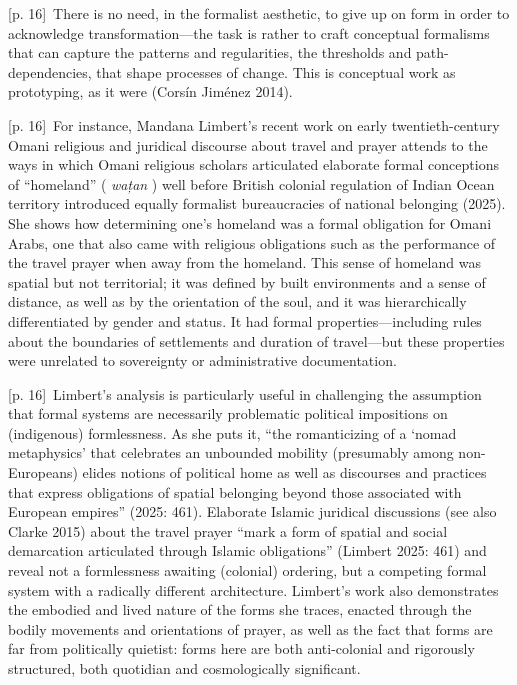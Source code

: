 \documentclass[10pt,a4paper]{article}
\begin{document}
{\scriptsize\color{gray} [p. 16]}\ There is no need, in the formalist aesthetic, to give up on form in order to acknowledge transformation—the task is rather to craft conceptual formalisms that can capture the patterns and regularities, the thresholds and path-dependencies, that shape processes of change. This is conceptual work as prototyping, as it were (Corsín Jiménez 2014).\par
{\scriptsize\color{gray} [p. 16]}\ For instance, Mandana Limbert’s recent work on early twentieth-century Omani religious and juridical discourse about travel and prayer attends to the ways in which Omani religious scholars articulated elaborate formal conceptions of “homeland” ( \textit{wațan} ) well before British colonial regulation of Indian Ocean territory introduced equally formalist bureaucracies of national belonging (2025). She shows how determining one’s homeland was a formal obligation for Omani Arabs, one that also came with religious obligations such as the performance of the travel prayer when away from the homeland. This sense of homeland was spatial but not territorial; it was defined by built environments and a sense of distance, as well as by the orientation of the soul, and it was hierarchically differentiated by gender and status. It had formal properties—including rules about the boundaries of settlements and duration of travel—but these properties were unrelated to sovereignty or administrative documentation.\par
{\scriptsize\color{gray} [p. 16]}\ Limbert’s analysis is particularly useful in challenging the assumption that formal systems are necessarily problematic political impositions on (indigenous) formlessness. As she puts it, “the romanticizing of a ‘nomad metaphysics’ that celebrates an unbounded mobility (presumably among non-Europeans) elides notions of political home as well as discourses and practices that express obligations of spatial belonging beyond those associated with European empires” (2025: 461). Elaborate Islamic juridical discussions (see also Clarke 2015) about the travel prayer “mark a form of spatial and social demarcation articulated through Islamic obligations” (Limbert 2025: 461) and reveal not a formlessness awaiting (colonial) ordering, but a competing formal system with a radically different architecture. Limbert’s work also demonstrates the embodied and lived nature of the forms she traces, enacted through the bodily movements and orientations of prayer, as well as the fact that forms are far from politically quietist: forms here are both anti-colonial and rigorously structured, both quotidian and cosmologically significant.\par
\end{document}
